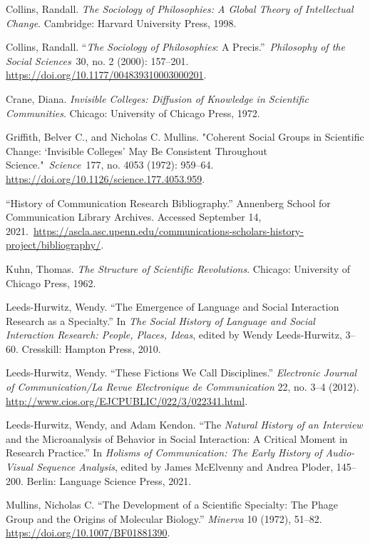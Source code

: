 \documentclass{tufte-handout}
\begin{document}
\begin{hangparas}{.25in}{1} 



Collins, Randall. \emph{The Sociology of Philosophies: A Global Theory
of Intellectual Change}. Cambridge: Harvard University Press, 1998.

Collins, Randall. ``\emph{The Sociology of Philosophies}: A
Precis.''~\emph{Philosophy of the Social Sciences}~30, no. 2 (2000):
157--201. \url{https://doi.org/10.1177/004839310003000201}.

Crane, Diana. \emph{Invisible Colleges: Diffusion of Knowledge in
Scientific Communities}. Chicago: University of Chicago Press, 1972.

Griffith, Belver C., and Nicholas C. Mullins. "Coherent Social Groups in
Scientific Change: `Invisible Colleges' May Be Consistent Throughout
Science."~\emph{Science}~177, no. 4053 (1972): 959--64. \url{https://doi.org/10.1126/science.177.4053.959}.

``History of Communication Research Bibliography.'' Annenberg School for
Communication Library Archives. Accessed September 14,
2021.~\href{https://ascla.asc.upenn.edu/communications-scholars-history-project/bibliography/}{https://ascla.asc.upenn.edu/communications-scholars-history-project/bibliography/}.

Kuhn, Thomas. \emph{The Structure of Scientific Revolutions}. Chicago:
University of Chicago Press, 1962.

Leeds-Hurwitz, Wendy. ``The Emergence of Language and Social Interaction
Research as a Specialty.'' In \emph{The Social History of Language and
Social Interaction Research: People, Places, Ideas}, edited by Wendy
Leeds-Hurwitz, 3--60. Cresskill: Hampton Press, 2010.

Leeds-Hurwitz, Wendy. ``These Fictions We Call Disciplines.''
\emph{Electronic Journal of Communication/La Revue Electronique de
Communication} 22, no. 3--4 (2012).
\url{http://www.cios.org/EJCPUBLIC/022/3/022341.html}.

Leeds-Hurwitz, Wendy, and Adam Kendon. ``The \emph{Natural History of an
Interview} and the Microanalysis of Behavior in Social Interaction: A
Critical Moment in Research Practice.'' In \emph{Holisms of
Communication: The Early History of Audio-Visual Sequence Analysis},
edited by James McElvenny and Andrea Ploder, 145--200. Berlin: Language
Science Press, 2021.

Mullins, Nicholas C. ``The Development of a Scientific Specialty: The
Phage Group and the Origins of Molecular Biology.'' \emph{Minerva} 10
(1972), 51--82. \url{https://doi.org/10.1007/BF01881390}.


\end{hangparas}
\end{document}
